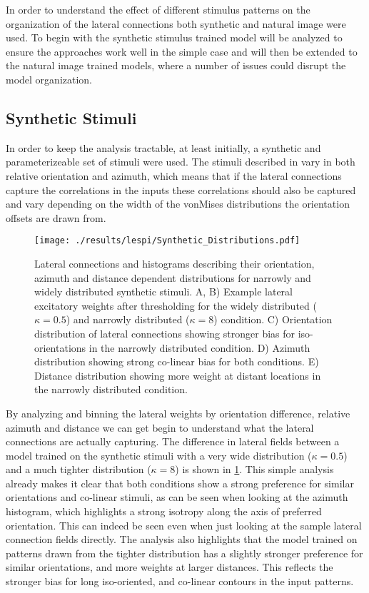 In order to understand the effect of different stimulus patterns on
the organization of the lateral connections both synthetic and natural
image were used. To begin with the synthetic stimulus trained model
will be analyzed to ensure the approaches work well in the simple case
and will then be extended to the natural image trained models, where a
number of issues could disrupt the model organization.

\subsection{Synthetic Stimuli}

In order to keep the analysis tractable, at least initially, a
synthetic and parameterizeable set of stimuli were used. The stimuli
described in \label{synthetic} vary in both relative orientation and
azimuth, which means that if the lateral connections capture the
correlations in the inputs these correlations should also be captured
and vary depending on the width of the vonMises distributions the
orientation offsets are drawn from.

\begin{figure}
	\centering
    \texttt{[image: ./results/lespi/Synthetic\_Distributions.pdf]}
	\caption[Distributions of lateral connections of models trained on
      synthetic stimuli]{Lateral connections and histograms describing
      their orientation, azimuth and distance dependent distributions
      for narrowly and widely distributed synthetic stimuli. A, B)
      Example lateral excitatory weights after thresholding for the
      widely distributed ($\kappa=0.5$) and narrowly distributed
      ($\kappa=8$) condition. C) Orientation distribution of lateral
      connections showing stronger bias for iso-orientations in the
      narrowly distributed condition. D) Azimuth distribution showing
      strong co-linear bias for both conditions. E) Distance
      distribution showing more weight at distant locations in the
      narrowly distributed condition.}
	\label{SyntheticDistributions}
\end{figure}

By analyzing and binning the lateral weights by orientation
difference, relative azimuth and distance we can get begin to
understand what the lateral connections are actually capturing. The
difference in lateral fields between a model trained on the synthetic
stimuli with a very wide distribution ($\kappa=0.5$) and a much
tighter distribution ($\kappa=8$) is shown in
\ref{SyntheticDistributions}. This simple analysis already makes it
clear that both conditions show a strong preference for similar
orientations and co-linear stimuli, as can be seen when looking at the
azimuth histogram, which highlights a strong isotropy along the axis
of preferred orientation. This can indeed be seen even when just
looking at the sample lateral connection fields directly. The analysis
also highlights that the model trained on patterns drawn from the
tighter distribution has a slightly stronger preference for similar
orientations, and more weights at larger distances. This reflects the
stronger bias for long iso-oriented, and co-linear contours in the
input patterns.


